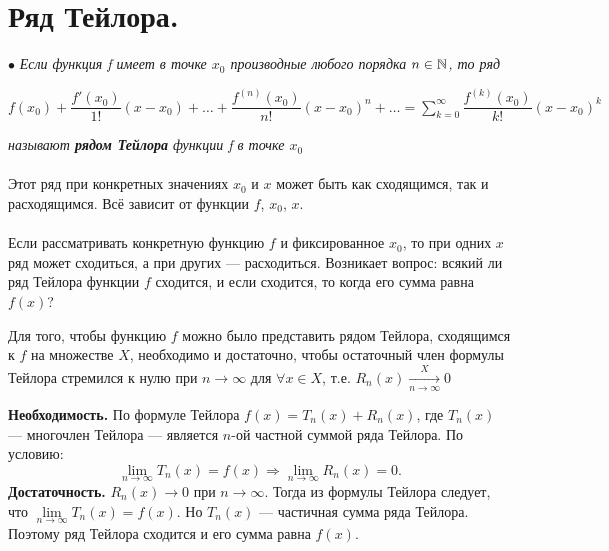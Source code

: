 	\section{Ряд Тейлора.}
	$\bullet$ \textit{Если функция f имеет в точке $x_0$ производные любого порядка $n\in\mathbb{N}$, то ряд}
	\begin{center}
		$f(x_0) + \dfrac{f'(x_0)}{1!}(x-x_0)+\ldots+\dfrac{f^{(n)}(x_0)}{n!}(x-x_0)^n+\ldots=\sum\limits_{k=0}^{\infty}\dfrac{f^{(k)}(x_0)}{k!}(x-x_0)^k$
	\end{center}
	\textit{называют \textbf{рядом Тейлора} функции f в точке $x_0$}\\\\
	Этот ряд при конкретных значениях $x_0$ и $x$ может быть как сходящимся, так и расходящимся. Всё зависит от функции $f$, $x_0$, $x$.\\\\
	Если рассматривать конкретную функцию $f$ и фиксированное $x_0$, то при одних $x$ ряд может сходиться, а при других --- расходиться. Возникает вопрос: всякий ли ряд Тейлора функции $f$ сходится, и если сходится, то когда его сумма равна $f(x)$?
	\begin{theorem}
		Для того, чтобы функцию $f$ можно было представить рядом Тейлора, сходящимся к $f$ на множестве $X$, необходимо и достаточно, чтобы остаточный член формулы Тейлора стремился к нулю при $n\to\infty$ для $\forall x\in X$, т.е. $R_n(x)\underset{n\to\infty}{\overset{X}{\longrightarrow}}0$	
	\end{theorem} 
	\begin{Proof}
		\textbf{Необходимость.} По формуле Тейлора $f(x)=T_n(x)+R_n(x)$, где $T_n(x)$ --- многочлен Тейлора --- является $n$-ой частной суммой ряда Тейлора. По условию:
		$$\lim\limits_{n\to\infty}T_n(x)=f(x)\Rightarrow\lim\limits_{n\to\infty}R_n(x)=0.$$
		\textbf{Достаточность.} $R_n(x)\to 0$ при $n\to\infty$. Тогда из формулы Тейлора следует, что $\lim\limits_{n\to\infty}T_n(x)=f(x)$. Но $T_n(x)$ --- частичная сумма ряда Тейлора. Поэтому ряд Тейлора сходится и его сумма равна $f(x)$.
	\end{Proof}
